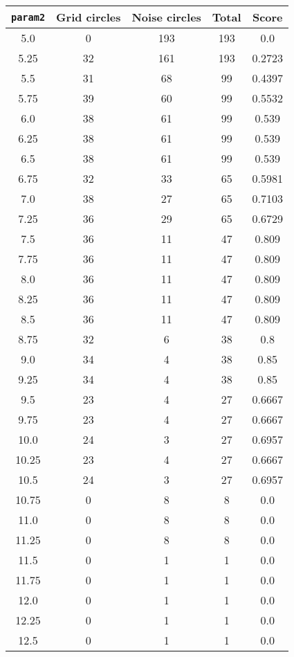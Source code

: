 \documentclass[letterpaper, 12pt]{article}
\begin{document}
\begin{longtable}{|c|c|c|c|c|}
\hline
\textbf{\texttt{param2}} & \textbf{Grid circles} & \textbf{Noise circles} & \textbf{Total} & \textbf{Score} \\
\hline
5.0 & 0 & 193 & 193 & 0.0 \\
\hline
5.25 & 32 & 161 & 193 & 0.2723 \\
\hline
5.5 & 31 & 68 & 99 & 0.4397 \\
\hline
5.75 & 39 & 60 & 99 & 0.5532 \\
\hline
6.0 & 38 & 61 & 99 & 0.539 \\
\hline
6.25 & 38 & 61 & 99 & 0.539 \\
\hline
6.5 & 38 & 61 & 99 & 0.539 \\
\hline
6.75 & 32 & 33 & 65 & 0.5981 \\
\hline
7.0 & 38 & 27 & 65 & 0.7103 \\
\hline
7.25 & 36 & 29 & 65 & 0.6729 \\
\hline
7.5 & 36 & 11 & 47 & 0.809 \\
\hline
7.75 & 36 & 11 & 47 & 0.809 \\
\hline
8.0 & 36 & 11 & 47 & 0.809 \\
\hline
8.25 & 36 & 11 & 47 & 0.809 \\
\hline
8.5 & 36 & 11 & 47 & 0.809 \\
\hline
8.75 & 32 & 6 & 38 & 0.8 \\
\hline
9.0 & 34 & 4 & 38 & 0.85 \\
\hline
9.25 & 34 & 4 & 38 & 0.85 \\
\hline
9.5 & 23 & 4 & 27 & 0.6667 \\
\hline
9.75 & 23 & 4 & 27 & 0.6667 \\
\hline
10.0 & 24 & 3 & 27 & 0.6957 \\
\hline
10.25 & 23 & 4 & 27 & 0.6667 \\
\hline
10.5 & 24 & 3 & 27 & 0.6957 \\
\hline
10.75 & 0 & 8 & 8 & 0.0 \\
\hline
11.0 & 0 & 8 & 8 & 0.0 \\
\hline
11.25 & 0 & 8 & 8 & 0.0 \\
\hline
11.5 & 0 & 1 & 1 & 0.0 \\
\hline
11.75 & 0 & 1 & 1 & 0.0 \\
\hline
12.0 & 0 & 1 & 1 & 0.0 \\
\hline
12.25 & 0 & 1 & 1 & 0.0 \\
\hline
12.5 & 0 & 1 & 1 & 0.0 \\

\end{longtable}
\end{document}

